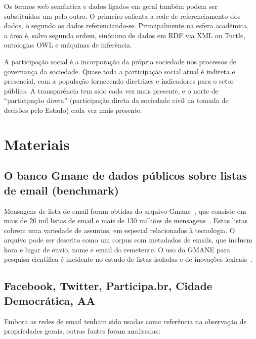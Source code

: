 \documentclass[a4paper,openright,12pt]{report} %
\begin{document}
Os termos web semântica e dados ligados em geral também podem ser 
substituídos um pelo outro. O primeiro salienta
a rede de referenciamento dos dados,
o segundo os dados referenciando-se. Principalmente na esfera
acadêmica, a área é, salvo segunda ordem, sinônimo de dados em 
RDF via XML ou Turtle, ontologias OWL e máquinas de inferència.

A participação social é a incorporação da própria sociedade nos 
processos de governança da sociedade.
Quase toda a participação social atual é indireta e presencial, 
com a população fornecendo diretrizes e indicadores para o setor público.
A transparência tem sido cada vez mais presente,
e o norte de ``participação direta'' (participação direta 
da sociedade civil na tomada de decisões pelo Estado)
cada vez mais presente. 

\chapter{Materiais}\label{sec:mat}
\section{O banco Gmane de dados públicos sobre listas de email (benchmark)}

Mensagens de lista de email foram obtidas do arquivo Gmane~\cite{gmanePack},
que consiste em mais de 20 mil listas de email e mais de 130 milhões de mensagens~\cite{GMANEwikipedia}.
Estas listas cobrem uma variedade de assuntos, em especial
relacionados à tecnologia. O arquivo pode ser descrito como
um corpus com metadados de emails, que incluem hora e lugar
de envio, nome e email do remetente. O uso do GMANE para
pesquisa científica é incidente no estudo de listas isoladas
e de inovações lexicais~\cite{GMANE2,bird}. 

\section{Facebook, Twitter, Participa.br, Cidade Democrática, AA}
Embora as redes de email tenham sido usadas como referência
na observação de propriedades gerais, outras fontes
foram analisadas:
\end{document}
